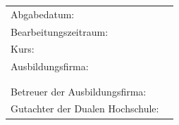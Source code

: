 \begin{titlepage}
\begin{center}
\end{center}

\begin{center}
	\vfill
	\begin{tabular}{ll}
		Abgabedatum:                     & \abgabe \\[0.2cm]
		Bearbeitungszeitraum:            & \bearbeitungszeitraum \\[0.2cm]
		Kurs:            				 & \kurs \\[0.2cm]
		Ausbildungsfirma:                & \firmaName \\
		                                 & \firmaStrasse \\
		                                 & \firmaPlz \\[0.2cm]
		Betreuer der Ausbildungsfirma:   & \betreuerFirma \\[0.2cm]
		Gutachter der Dualen Hochschule: & \betreuerDhbw \\[2cm]
	\end{tabular} 
\end{center}
\end{titlepage}
